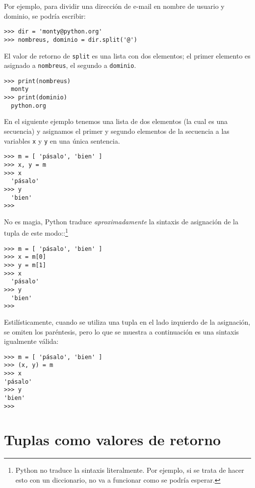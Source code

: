 Por ejemplo, para dividir una dirección de
e-mail en nombre de usuario y dominio, se podría escribir:

  

\begin{Verbatim}[frame=single]
>>> dir = 'monty@python.org'
>>> nombreus, dominio = dir.split('@')
\end{Verbatim}


El valor de retorno de \texttt{split} es una lista con dos elementos; el
primer elemento es asignado a \texttt{nombreus}, el segundo a
\texttt{dominio}.


\begin{Verbatim}[frame=single]
>>> print(nombreus)
  monty
>>> print(dominio)
  python.org
\end{Verbatim}


En el siguiente ejemplo tenemos una lista de dos elementos (la cual es una
secuencia) y asignamos el primer y segundo elementos de la secuencia a
las variables \texttt{x} y \texttt{y} en una única sentencia.

\begin{Verbatim}[frame=single]
>>> m = [ 'pásalo', 'bien' ]
>>> x, y = m
>>> x
  'pásalo'
>>> y
  'bien'
>>>
\end{Verbatim}

No es magia, Python traduce \emph{aproximadamente} la sintaxis de
asignación de la tupla de este modo::\footnote{Python no traduce la
sintaxis literalmente. Por ejemplo, si se trata de hacer esto con un
diccionario, no va a funcionar como se podría esperar.}


\begin{Verbatim}[frame=single]
>>> m = [ 'pásalo', 'bien' ]
>>> x = m[0]
>>> y = m[1]
>>> x
  'pásalo'
>>> y
  'bien'
>>>
\end{Verbatim}

Estilísticamente, cuando se utiliza una tupla en el lado izquierdo de la
asignación, se omiten los paréntesis, pero lo que se muestra a
continuación es una sintaxis igualmente válida:


\begin{Verbatim}[frame=single]
>>> m = [ 'pásalo', 'bien' ]
>>> (x, y) = m
>>> x
'pásalo'
>>> y
'bien'
>>>
\end{Verbatim}


\section{Tuplas como valores de retorno}

